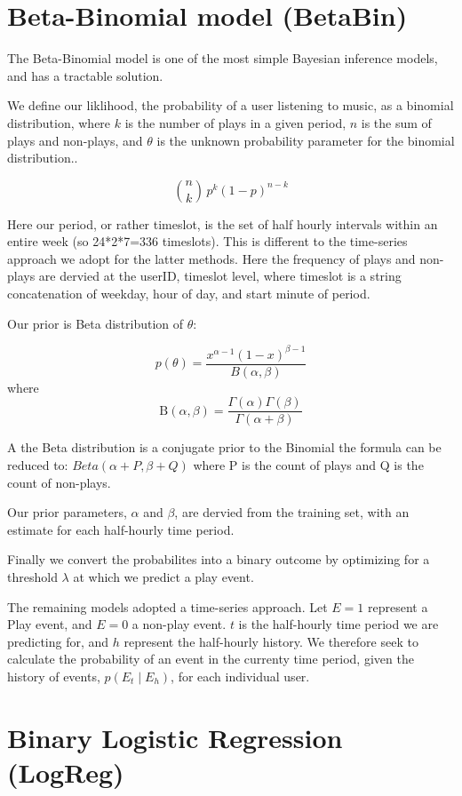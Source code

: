 \section{Beta-Binomial model (BetaBin)}

The Beta-Binomial model is one of the most simple Bayesian inference models, and has a tractable solution.

We define our liklihood, the probability of a user listening to music, as a binomial distribution, where $k$ is the number of plays in a given period, $n$ is the sum of plays and non-plays, and $\theta$ is the unknown probability parameter for the binomial distribution.. 

$${n \choose k}\,p^{k}(1-p)^{n-k}$$

Here our period, or rather timeslot, is the set of half hourly intervals within an entire week (so 24*2*7=336 timeslots). This is different to the time-series approach we adopt for the latter methods. Here the frequency of plays and non-plays are dervied at the userID, timeslot level, where timeslot is a string concatenation of weekday, hour of day, and start minute of period. 

Our prior is Beta distribution of $\theta$:

$$p(\theta)=\frac{x^{\alpha-1}(1-x)^{\beta-1}} {B(\alpha,\beta)}$$ where
$$\mathrm {B} (\alpha ,\beta )={\frac {\Gamma (\alpha )\Gamma (\beta )}{\Gamma (\alpha +\beta )}}$$

A the Beta distribution is a conjugate prior to the Binomial the formula can be reduced to: $Beta(\alpha+P, \beta+Q)$ where P is the count of plays and Q is the count of non-plays.

Our prior parameters, $\alpha$ and $\beta$, are dervied from the training set, with an estimate for each half-hourly time period. 

Finally we convert the probabilites into a binary outcome by optimizing for a threshold $\lambda$ at which we predict a play event.

The remaining models adopted a time-series approach. Let $E = 1$ represent a Play event, and $E = 0$ a non-play event. $t$ is the half-hourly time period we are predicting for, and $h$ represent the half-hourly history. We therefore seek to calculate the probability of an event in the currenty time period, given the history of events, $p(E_t \mid E_h)$, for each individual user. 

\section{Binary Logistic Regression (LogReg)}


